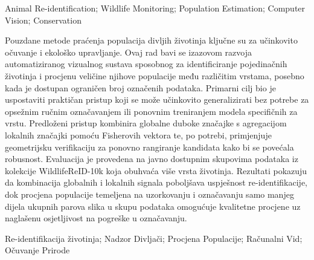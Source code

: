 \documentclass[masterthesis]{fer}
\begin{document}
\begin{keywords}
Animal Re-identification; Wildlife Monitoring; Population Estimation; Computer Vision; Conservation
\end{keywords}

\begin{sazetak}
Pouzdane metode praćenja populacija divljih životinja ključne su za učinkovito očuvanje i ekološko upravljanje. Ovaj rad bavi se izazovom razvoja automatiziranog vizualnog sustava sposobnog za identificiranje pojedinačnih životinja i procjenu veličine njihove populacije među različitim vrstama, posebno kada je dostupan ograničen broj označenih podataka. Primarni cilj bio je uspostaviti praktičan pristup koji se može učinkovito generalizirati bez potrebe za opsežnim ručnim označavanjem ili ponovnim treniranjem modela specifičnih za vrstu. Predloženi pristup kombinira globalne duboke značajke s agregacijom lokalnih značajki pomoću Fisherovih vektora te, po potrebi, primjenjuje geometrijsku verifikaciju za ponovno rangiranje kandidata kako bi se povećala robusnost. Evaluacija je provedena na javno dostupnim skupovima podataka iz kolekcije WildlifeReID-10k koja obuhvaća više vrsta životinja. Rezultati pokazuju da kombinacija globalnih i lokalnih signala poboljšava uspješnost re-identifikacije, dok procjena populacije temeljena na uzorkovanju i označavanju samo manjeg dijela ukupnih parova slika u skupu podataka omogućuje kvalitetne procjene uz naglašenu osjetljivost na pogreške u označavanju.
\end{sazetak}

\begin{kljucnerijeci}
Re-identifikacija životinja; Nadzor Divljači; Procjena Populacije; Računalni Vid; Očuvanje Prirode
\end{kljucnerijeci}
\end{document}
